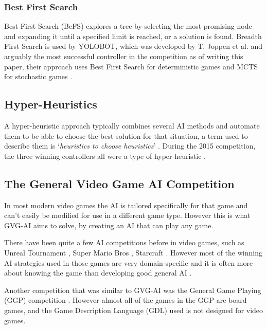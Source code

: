 \documentclass[journal]{IEEEtran}
\begin{document}
	\subsubsection{Best First Search}\label{sssec:BeFS}
			Best First Search (BeFS) explores a tree by selecting the most promising node and expanding it until a specified limit is reached, or a solution is found.
			Breadth First Search is used by YOLOBOT, which was developed by T. Joppen et al. \cite{joppen2017informed} and arguably the most successful controller in the competition as of writing this paper, their approach uses Best First Search for deterministic games and MCTS for stochastic games \cite{perez2018general}.

	\subsection{Hyper-Heuristics} \label{HH}
		A hyper-heuristic approach typically combines several AI methods and automate them to be able to choose the best solution for that situation, a term used to describe them is `\textit{heuristics to choose heuristics}' \cite{burke2013hyper, burke2010classification, hyperHeurisicMendes}.
		During the 2015 competition, the three winning controllers all were a type of hyper-heuristic \cite{horn2016mcts}.


		

	\subsection{The General Video Game AI Competition} \label{ssec:GVGAIC}
	
		In most modern video games the AI is tailored specifically for that game and can't easily be modified for use in a different game type. However this is what GVG-AI aims to solve, by creating an AI that can play any game. 
		
		There have been quite a few AI competitions before in video games, such as Unreal Tournament \cite{hingston2010new}, Super Mario Bros \cite{shaker2013turing}, Starcraft \cite{ontanon2013survey}. 
		However most of the winning AI strategies used in those games are very domain-specific and it is often more about knowing the game than developing good general AI \cite{perez20162014}. 
		 \par
		
		
		Another competition that was similar to GVG-AI was the General Game Playing (GGP) competition \cite{GGP2005general, love2008general}. However almost all of the games in the GGP are board games, and the Game Description Language (GDL) used is not designed for video games.
		
\end{document}
